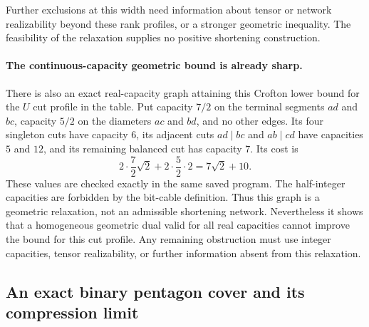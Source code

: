 Further exclusions at this width need information about
tensor or network realizability beyond these rank profiles,
or a stronger geometric inequality.  The feasibility of the
relaxation supplies no positive shortening construction.

\paragraph{The continuous-capacity geometric bound is already sharp.}
There is also an exact real-capacity graph attaining this
Crofton lower bound for the $U$ cut profile in the table.
Put capacity $7/2$ on the terminal
segments $ad$ and $bc$, capacity $5/2$ on the diameters
$ac$ and $bd$, and no other edges.  Its four singleton
cuts have capacity $6$, its adjacent cuts $ad\mid bc$
and $ab\mid cd$ have capacities $5$ and $12$, and its
remaining balanced cut has capacity $7$.  Its cost is
\[
 2\cdot\frac72\sqrt2+2\cdot\frac52\cdot2
 =7\sqrt2+10.
\]
These values are checked exactly in the same saved program.
The half-integer capacities are forbidden by the bit-cable
definition.  Thus this graph is a geometric relaxation,
not an admissible shortening network.  Nevertheless it
shows that a homogeneous geometric dual valid for all
real capacities cannot improve the bound for this cut
profile.  Any remaining obstruction must use integer
capacities, tensor realizability, or further information
absent from this relaxation.

\subsection{An exact binary pentagon cover and its compression limit}

